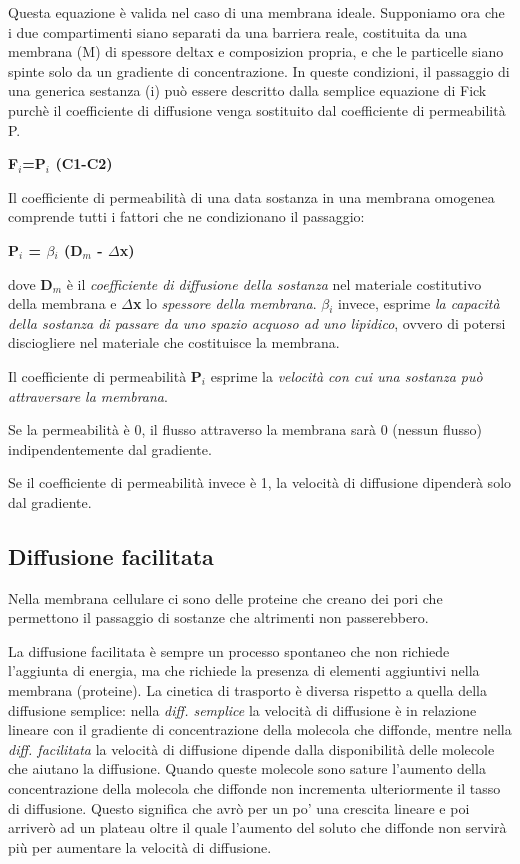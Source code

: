\documentclass[]{article}
\begin{document}
Questa equazione è valida nel caso di una membrana ideale. Supponiamo
ora che i due compartimenti siano separati da una barriera reale,
costituita da una membrana (M) di spessore deltax e composizion propria,
e che le particelle siano spinte solo da un gradiente di concentrazione.
In queste condizioni, il passaggio di una generica sestanza (i) può
essere descritto dalla semplice equazione di Fick purchè il coefficiente
di diffusione venga sostituito dal coefficiente di permeabilità P.

\textbf{F\(_i\)=P\(_i\) (C1-C2)}

Il coefficiente di permeabilità di una data sostanza in una membrana
omogenea comprende tutti i fattori che ne condizionano il passaggio:

\textbf{P\(_i\) = \(\beta\)\(_i\) (D\(_m\) - \(\Delta\)x)}

dove \textbf{D\(_m\)} è il \emph{coefficiente di diffusione della
sostanza} nel materiale costitutivo della membrana e
\textbf{\(\Delta\)x} lo \emph{spessore della membrana}.
\textbf{\(\beta\)\(_i\)} invece, esprime \emph{la capacità della
sostanza di passare da uno spazio acquoso ad uno lipidico}, ovvero di
potersi disciogliere nel materiale che costituisce la membrana.

Il coefficiente di permeabilità \textbf{P\(_i\)} esprime la
\emph{velocità con cui una sostanza può attraversare la membrana}.

Se la permeabilità è 0, il flusso attraverso la membrana sarà 0 (nessun
flusso) indipendentemente dal gradiente.

Se il coefficiente di permeabilità invece è 1, la velocità di diffusione
dipenderà solo dal gradiente.

\subsection{Diffusione facilitata}\label{diffusione-facilitata}

Nella membrana cellulare ci sono delle proteine che creano dei pori che
permettono il passaggio di sostanze che altrimenti non passerebbero.

La diffusione facilitata è sempre un processo spontaneo che non richiede
l'aggiunta di energia, ma che richiede la presenza di elementi
aggiuntivi nella membrana (proteine). La cinetica di trasporto è diversa
rispetto a quella della diffusione semplice: nella \emph{diff. semplice}
la velocità di diffusione è in relazione lineare con il gradiente di
concentrazione della molecola che diffonde, mentre nella \emph{diff.
facilitata} la velocità di diffusione dipende dalla disponibilità delle
molecole che aiutano la diffusione. Quando queste molecole sono sature
l'aumento della concentrazione della molecola che diffonde non
incrementa ulteriormente il tasso di diffusione. Questo significa che
avrò per un po' una crescita lineare e poi arriverò ad un plateau oltre
il quale l'aumento del soluto che diffonde non servirà più per aumentare
la velocità di diffusione.
\end{document}
